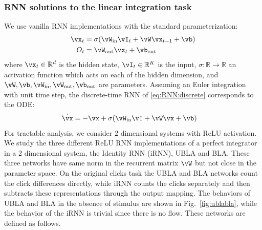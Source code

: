 \documentclass{article} %
\newcounter{ct}
\newcommand{\win}{\vW_{\text{in}}}
\newcommand{\wout}{\vW_{\text{out}}}
\newcommand{\bout}{\vb_{\text{out}}}
\newcommand{\reals}{\mathbb{R}}
\theoremstyle{definition}
\theoremstyle{remark}
\begin{document}

\subsubsection{RNN solutions to the linear integration task}\label{sec:rnn:integration}
We use vanilla RNN implementations with the standard parameterization:
\begin{equation}
  \begin{aligned}
	\vx_t &= \sigma(\win \vI_t + \vW \vx_{t-1} + \vb) \label{eq:RNN:discrete}\\
	O_t &= \wout \vx_t + \bout
  \end{aligned}
\end{equation}
where $\vx_t \in \reals^d$ is the hidden state, $\vI_t \in \reals^K$ is the input,
$\sigma: \reals \to \reals$ an activation function which acts on each of the hidden dimension, and
$\vW, \vb, \win, \wout, \bout$ are parameters.
Assuming an Euler integration with unit time step, the discrete-time RNN of \eqref{eq:RNN:discrete} corresponds to the ODE:
\begin{align}
    \dot{\vx} &= -\vx + \sigma(\win \vI + \vW \vx + \vb) \label{eq:RNN:continuous}
\end{align}
%
For tractable analysis, we consider $2$ dimensional systems with ReLU activation. %
We study the three different ReLU RNN implementations of a perfect integrator in a 2 dimensional system, the Identity RNN (iRNN), UBLA and BLA.
These three networks have same norm in the recurrent matrix $\vW$ but not close in the parameter space.
On the original clicks task the UBLA and BLA networks count the click differences directly, while iRNN counts the clicks separately and then subtracts these representations through the output mapping.
The behaviors of UBLA and BLA in the absence of stimulus are shown in Fig.~\ref{fig:ublabla}, while the behavior of the iRNN is trivial since there is no flow. These networks are defined as follows.
\end{document}

